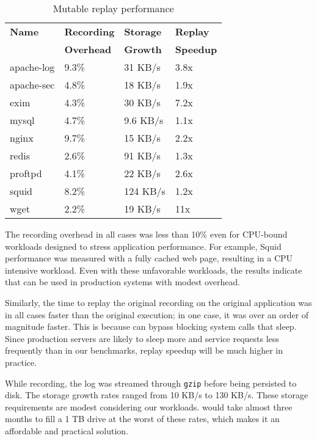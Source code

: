 \begin{table}[t]
\begin{center}
\small
\begin{tabular}{|l|l|l|l|}   \hline
  {\bf Name} & {\bf Recording } & {\bf Storage } & {\bf Replay } \\
             & {\bf Overhead}   & {\bf Growth}   & {\bf Speedup} \\
\hline\hline
		apache-log &
		9.3\% &
		31 KB/s &
		3.8x \\
\hline
		apache-sec &
		4.8\% &
		18 KB/s &
		1.9x \\
\hline
		exim &
		4.3\% &
		30 KB/s &
		7.2x \\
\hline
		mysql &
		4.7\% &
		9.6 KB/s &
		1.1x \\
\hline
		nginx &
		9.7\% &
		15 KB/s &
		2.2x \\
\hline
		redis &
		2.6\% &
		91 KB/s &
		1.3x \\
\hline
		proftpd &
		4.1\% &
		22 KB/s &
		2.6x \\
\hline
		squid &
		8.2\% &
		124 KB/s &
		1.2x \\
\hline
		wget &
		2.2\% &
		19 KB/s &
		11x \\
\hline
\end{tabular}
\end{center}
\renewcommand\thetable{4}
\caption{Mutable replay performance}
\label{tab:performance}
\end{table}

The recording overhead in all cases was less than
10\% even for CPU-bound workloads designed to stress application
performance. For example, Squid performance was measured with a fully
cached web page, resulting in a CPU
intensive workload. Even with these unfavorable workloads, the results indicate
that {\dora} can be used in production systems with modest overhead.

Similarly, the time to replay the original recording on the original application
was in all cases faster than the original execution; in one case, it was over an
order of magnitude faster.
This is because {\dora} can bypass blocking system calls that sleep.
Since production servers are likely to sleep more and
service requests less frequently than in our benchmarks, replay
speedup will be much higher in practice.

While recording, the log was streamed through {\tt gzip} before being persisted to
disk. The storage growth rates ranged from 10 KB/s to 130 KB/s. These
storage requirements are modest considering our workloads. {\dora}
would take almost three months to fill a 1 TB drive at the worst
of these rates, which makes it an affordable and practical solution.
